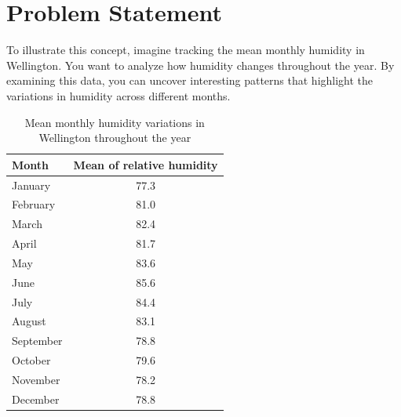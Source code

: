 

\section*{Problem Statement}

To illustrate this concept, imagine tracking the mean monthly humidity in Wellington. You want to analyze how humidity changes throughout the year. By examining this data, you can uncover interesting patterns that highlight the variations in humidity across different months. 

\begin{table}[hbt]
	\centering
	\begin{tabular}{lc}
		\toprule
		Month & Mean of relative humidity \\
		\midrule
		January & 77.3 \\ 
		February & 81.0 \\
		March & 82.4 \\
		April & 81.7 \\
		May & 83.6 \\ 
		June & 85.6 \\
		July & 84.4 \\
		August & 83.1 \\ 
		September & 78.8 \\
		October & 79.6 \\
		November & 78.2 \\
		December & 78.8 \\
		\bottomrule
	\end{tabular}
	\caption{Mean monthly humidity variations in Wellington throughout the year}
	\label{tab:humidity}
\end{table}


